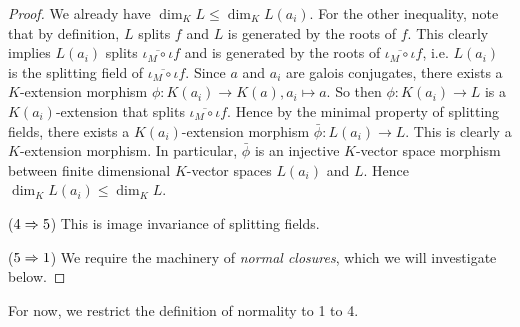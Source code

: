 \documentclass[../book.tex]{subfiles}
\begin{document}
\begin{proof}
        We already have $\dim_K L \leq \dim_K L(a_i)$.
        For the other inequality, note that by definition, 
        $L$ splits $f$ and $L$ is generated by the roots of $f$. 
        This clearly implies $L(a_i)$ splits $\overline{\iota_M \circ \iota} f$
        and is generated by the roots of $\overline{\iota_M \circ \iota} f$, i.e.
        $L(a_i)$ is the splitting field of $\overline{\iota_M\circ\iota} f$.
        Since $a$ and $a_i$ are galois conjugates, 
        there exists a $K$-extension morphism $\phi : K(a_i) \to K(a), a_i \mapsto a$.
        So then $\phi : K(a_i) \to L$ is a $K(a_i)$-extension that splits
        $\overline{\iota_M\circ\iota} f$. 
        Hence by the minimal property of splitting fields, 
        there exists a $K(a_i)$-extension morphism $\bar\phi : L(a_i) \to L$. 
        This is clearly a $K$-extension morphism. 
        In particular, $\bar\phi$ is an injective $K$-vector space morphism
        between finite dimensional $K$-vector spaces $L(a_i)$ and $L$. 
        Hence $\dim_K L(a_i) \leq \dim_K L$. 
        
    ($4 \Rightarrow 5$)
        This is image invariance of splitting fields.
    
    ($5 \Rightarrow 1$)
        We require the machinery of \emph{normal closures}, which we will investigate below.
\end{proof}

For now, we restrict the definition of normality to 1 to 4. 
\end{document}
